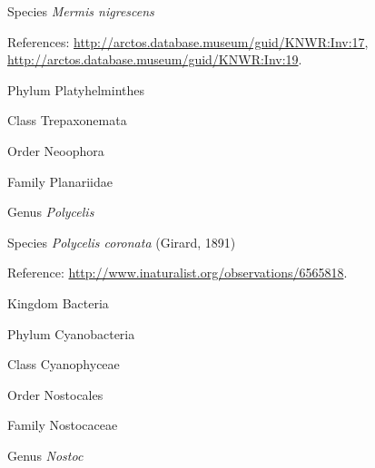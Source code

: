 \documentclass[9pt, article]{memoir}
\begin{document}
\begin{multicols}{2}
\vspace{6pt}\noindent\hspace{36pt}Species \textit{Mermis nigrescens}


\vspace{6pt}References: 
\url{http://arctos.database.museum/guid/KNWR:Inv:17}, 
\url{http://arctos.database.museum/guid/KNWR:Inv:19}.

\vspace{6pt}\noindent\hspace{6pt}Phylum Platyhelminthes


\vspace{6pt}\noindent\hspace{12pt}Class Trepaxonemata


\vspace{6pt}\noindent\hspace{18pt}Order Neoophora


\vspace{6pt}\noindent\hspace{24pt}Family Planariidae


\vspace{6pt}\noindent\hspace{30pt}Genus \textit{Polycelis}


\vspace{6pt}\noindent\hspace{36pt}Species \textit{Polycelis coronata} (Girard, 1891)


\vspace{6pt}Reference: 
\url{http://www.inaturalist.org/observations/6565818}.

\vspace{6pt}\noindent\hspace{0pt}Kingdom Bacteria


\vspace{6pt}\noindent\hspace{6pt}Phylum Cyanobacteria


\vspace{6pt}\noindent\hspace{12pt}Class Cyanophyceae


\vspace{6pt}\noindent\hspace{18pt}Order Nostocales


\vspace{6pt}\noindent\hspace{24pt}Family Nostocaceae


\vspace{6pt}\noindent\hspace{30pt}Genus \textit{Nostoc}



\end{multicols}
\end{document}
